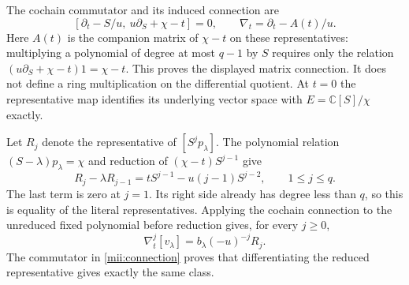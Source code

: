 \documentclass[11pt]{article}
\newcommand{\CC}{\mathbb C}
\begin{document}
The cochain commutator and its induced connection are
\begin{equation}\tag{MII16}\label{mii:connection}
 [\partial_t-S/u,\ u\partial_S+\chi-t]=0,
 \qquad\nabla_t=\partial_t-A(t)/u.
\end{equation}
Here $A(t)$ is the companion matrix of $\chi-t$ on these
representatives: multiplying a polynomial of degree at most $q-1$
by $S$ requires only the relation
$(u\partial_S+\chi-t)1=\chi-t$. This proves the displayed matrix
connection. It does not define a ring multiplication on the
differential quotient. At $t=0$ the representative map identifies
its underlying vector space with $E=\CC[S]/\chi$ exactly.

Let $R_j$ denote the representative of $[S^j p_\lambda]$. The
polynomial relation $(S-\lambda)p_\lambda=\chi$ and reduction of
$(\chi-t)S^{j-1}$ give
\begin{equation}\tag{MII17}\label{mii:recurrence}
 R_j-\lambda R_{j-1}
       =t S^{j-1}-u(j-1)S^{j-2},\qquad 1\le j\le q.
\end{equation}
The last term is zero at $j=1$. Its right side already has degree
less than $q$, so this is equality of the literal representatives.
Applying the cochain connection to the unreduced fixed polynomial
before reduction gives, for every $j\ge0$,
\begin{equation}\tag{MII18}\label{mii:jets}
 \nabla_t^j[v_\lambda]=b_\lambda(-u)^{-j}R_j.
\end{equation}
The commutator in \eqref{mii:connection} proves that differentiating
the reduced representative gives exactly the same class.
\end{document}
